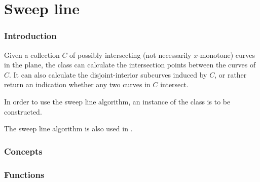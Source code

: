 \chapter{Sweep line}

\subsection*{Introduction}

Given a collection $C$ of possibly intersecting 
(not necessarily $x$-monotone) curves in the plane, 
the  class can calculate the intersection points between 
the curves of $C$. It can also calculate the disjoint-interior subcurves
induced by $C$, or rather return an indication whether any two curves in 
$C$ intersect.

In order to use the sweep line algorithm, an instance of the 
 class is to be constructed. 

The sweep line algorithm is also used in 
. 

\begin{ccTexOnly}

\subsection*{Concepts}

\subsection*{Functions}

\end{ccTexOnly}    

